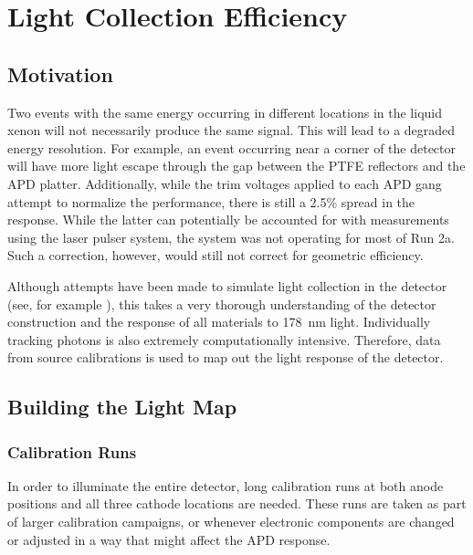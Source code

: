 \documentclass[herrin-thesis.tex]{subfiles}
\begin{document}
\chapter{Light Collection Efficiency}
\label{app:lightmap}

\section{Motivation}
Two events with the same energy occurring in different locations in the liquid xenon will not necessarily produce the same signal. This will lead to a degraded energy resolution. For example, an event occurring near a corner of the detector will have more light escape through the gap between the PTFE reflectors and the APD platter. Additionally, while the trim voltages applied to each APD gang attempt to normalize the performance, there is still a 2.5\% spread in the response. While the latter can potentially be accounted for with measurements using the laser pulser system, the system was not operating for most of Run 2a. Such a correction, however, would still not correct for geometric efficiency.

Although attempts have been made to simulate light collection in the detector (see, for example \cite{Mackay:2011fk}), this takes a very thorough understanding of the detector construction and the response of all materials to \SI{178}{\nm} light. Individually tracking photons is also extremely computationally intensive. Therefore, data from source calibrations is used to map out the light response of the detector.

\section{Building the Light Map}
\subsection{Calibration Runs}
In order to illuminate the entire detector, long calibration runs at both anode positions and all three cathode locations are needed. These runs are taken as part of larger calibration campaigns, or whenever electronic components are changed or adjusted in a way that might affect the APD response.
\end{document}
